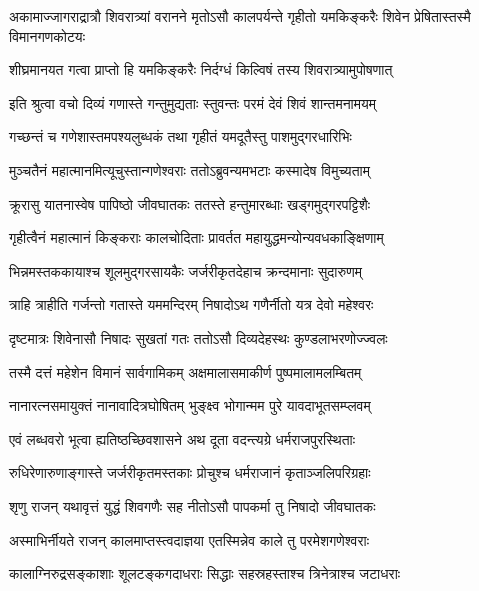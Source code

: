 \threelineshloka
{अकामाज्जागराद्रात्रौ शिवरात्र्यां वरानने}
{मृतोऽसौ कालपर्यन्ते गृहीतो यमकिङ्करैः}
{शिवेन प्रेषितास्तस्मै विमानगणकोटयः} %


\twolineshloka
{शीघ्रमानयत गत्वा प्राप्तो हि यमकिङ्करैः}
{निर्दग्धं किल्विषं तस्य शिवरात्र्यामुपोषणात्} %


\twolineshloka
{इति श्रुत्वा वचो दिव्यं गणास्ते गन्तुमुद्यताः}
{स्तुवन्तः परमं देवं शिवं शान्तमनामयम्} %

\twolineshloka
{गच्छन्तं च गणेशास्तमपश्यलुब्धकं तथा}
{गृहीतं यमदूतैस्तु पाशमुद्गरधारिभिः} %

\twolineshloka
{मुञ्चतैनं महात्मानमित्यूचुस्तान्गणेश्वराः}
{ततोऽब्रुवन्यमभटाः कस्मादेष विमुच्यताम्} %

\twolineshloka
{क्रूरासु यातनास्वेष पापिष्ठो जीवघातकः}
{ततस्ते हन्तुमारब्धाः खड्गमुद्गरपट्टिशैः} %

\twolineshloka
{गृहीत्वैनं महात्मानं किङ्कराः कालचोदिताः}
{प्रावर्तत महायुद्धमन्योन्यवधकाङ्क्षिणाम्} %

\twolineshloka
{भिन्नमस्तककायाश्च शूलमुद्गरसायकैः}
{जर्जरीकृतदेहाच क्रन्दमानाः सुदारुणम्} %

\twolineshloka
{त्राहि त्राहीति गर्जन्तो गतास्ते यममन्दिरम्}
{निषादोऽथ गणैर्नीतो यत्र देवो महेश्वरः} %

\twolineshloka
{दृष्टमात्रः शिवेनासौ निषादः सुखतां गतः}
{ततोऽसौ दिव्यदेहस्थः कुण्डलाभरणोज्ज्वलः} %

\twolineshloka
{तस्मै दत्तं महेशेन विमानं सार्वगामिकम्}
{अक्षमालासमाकीर्ण पुष्पमालामलम्बितम्} %

\twolineshloka
{नानारत्नसमायुक्तं नानावादित्रघोषितम्}
{भुङ्क्ष्व भोगान्मम पुरे यावदाभूतसम्प्लवम्} %

\twolineshloka
{एवं लब्धवरो भूत्वा ह्यतिष्ठच्छिवशासने}
{अथ दूता वदन्त्यग्रे धर्मराजपुरस्थिताः} %

\twolineshloka
{रुधिरेणारुणाङ्गास्ते जर्जरीकृतमस्तकाः}
{प्रोचुश्च धर्मराजानं कृताञ्जलिपरिग्रहाः} %


\twolineshloka
{शृणु राजन् यथावृत्तं युद्धं शिवगणैः सह}
{नीतोऽसौ पापकर्मा तु निषादो जीवघातकः} %

\twolineshloka
{अस्माभिर्नीयते राजन् कालमाप्तस्त्वदाज्ञया}
{एतस्मिन्नेव काले तु परमेशगणेश्वराः} %

\twolineshloka
{कालाग्निरुद्रसङ्काशाः शूलटङ्कगदाधराः}
{सिद्धाः सहस्रहस्ताश्च त्रिनेत्राश्च जटाधराः} %

